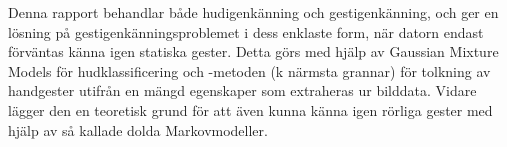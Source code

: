 \documentclass[../rapport_MVEX01-11-05]{subfiles}
\begin{document}
Denna rapport behandlar både hudigenkänning och gestigenkänning, och ger en
lösning på gestigenkänningsproblemet i dess enklaste form, när
datorn endast förväntas känna igen statiska gester. Detta görs med hjälp av
Gaussian Mixture Models för hudklassificering och \knn-metoden (k
närmsta grannar) för tolkning
av handgester utifrån en mängd egenskaper som extraheras ur bilddata.
Vidare lägger den en
teoretisk grund för att även kunna känna igen rörliga gester med hjälp av
så kallade dolda Markovmodeller.
\end{document}
